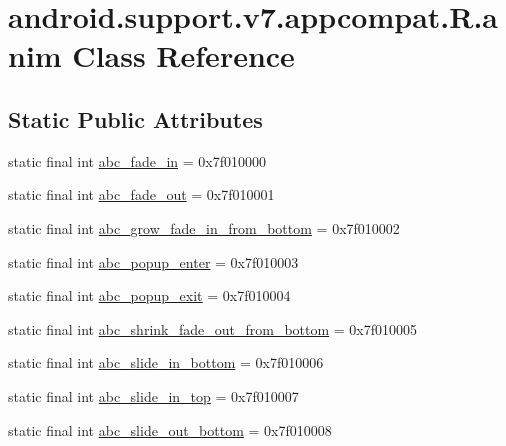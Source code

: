 \hypertarget{classandroid_1_1support_1_1v7_1_1appcompat_1_1R_1_1anim}{}\section{android.\+support.\+v7.\+appcompat.\+R.\+anim Class Reference}
\label{classandroid_1_1support_1_1v7_1_1appcompat_1_1R_1_1anim}
\subsection*{Static Public Attributes}
\begin{DoxyCompactItemize}
\item 
static final int \mbox{\hyperlink{classandroid_1_1support_1_1v7_1_1appcompat_1_1R_1_1anim_a665e81e9b94944163fe09d845ed3acb4}{abc\+\_\+fade\+\_\+in}} = 0x7f010000
\item 
static final int \mbox{\hyperlink{classandroid_1_1support_1_1v7_1_1appcompat_1_1R_1_1anim_a9ee34f536803896c9ff3565989bbbeef}{abc\+\_\+fade\+\_\+out}} = 0x7f010001
\item 
static final int \mbox{\hyperlink{classandroid_1_1support_1_1v7_1_1appcompat_1_1R_1_1anim_a453e567186301fd6de044b87e3895137}{abc\+\_\+grow\+\_\+fade\+\_\+in\+\_\+from\+\_\+bottom}} = 0x7f010002
\item 
static final int \mbox{\hyperlink{classandroid_1_1support_1_1v7_1_1appcompat_1_1R_1_1anim_a4ebe12e5d55910691a4c025423c8c5c6}{abc\+\_\+popup\+\_\+enter}} = 0x7f010003
\item 
static final int \mbox{\hyperlink{classandroid_1_1support_1_1v7_1_1appcompat_1_1R_1_1anim_a663ac7c42efa1a4de1cd936b6d98d894}{abc\+\_\+popup\+\_\+exit}} = 0x7f010004
\item 
static final int \mbox{\hyperlink{classandroid_1_1support_1_1v7_1_1appcompat_1_1R_1_1anim_a9bfbcebac78098ea68cf7a159c4405f7}{abc\+\_\+shrink\+\_\+fade\+\_\+out\+\_\+from\+\_\+bottom}} = 0x7f010005
\item 
static final int \mbox{\hyperlink{classandroid_1_1support_1_1v7_1_1appcompat_1_1R_1_1anim_abb2d88595ab4324c44388605906fa733}{abc\+\_\+slide\+\_\+in\+\_\+bottom}} = 0x7f010006
\item 
static final int \mbox{\hyperlink{classandroid_1_1support_1_1v7_1_1appcompat_1_1R_1_1anim_ac0aa69e88ce72f0047081d13502c4068}{abc\+\_\+slide\+\_\+in\+\_\+top}} = 0x7f010007
\item 
static final int \mbox{\hyperlink{classandroid_1_1support_1_1v7_1_1appcompat_1_1R_1_1anim_a112797338f6fb204a8a1c71bad3e4367}{abc\+\_\+slide\+\_\+out\+\_\+bottom}} = 0x7f010008

\end{DoxyCompactItemize}

